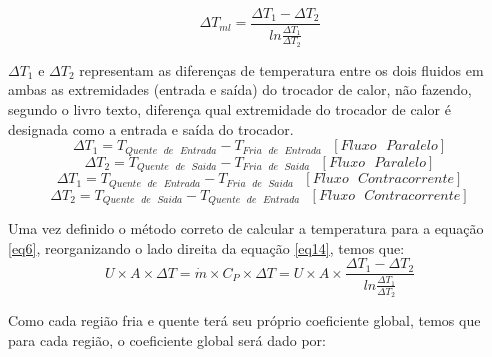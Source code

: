 \documentclass[a4paper,12pt,oneside]{article}
\begin{document}
\begin{flushright}
\begin{equation}\label{eq30}
\Delta T_{ml} = \frac{\Delta T_{1} - \Delta T_{2}}{ln \frac{\Delta T_{1}}{\Delta T_{2}}}
\end{equation}
\vspace{0.5cm}

$\Delta T_{1}$ e $\Delta T_{2}$ representam as diferenças de temperatura entre os dois fluidos em ambas as extremidades (entrada e saída) do trocador de calor, não fazendo, segundo o livro texto, diferença qual extremidade do trocador de calor é designada como a entrada e saída do trocador.\\

\begin{equation}\label{eq31}
\Delta T_{1} = T_{Quente\,\,\,\, de\,\,\,\, Entrada} - T_{Fria\,\,\,\, de\,\,\,\, Entrada} \,\,\,\,[Fluxo\,\,\,\, Paralelo]
\end{equation}
\vspace{0.1cm}
\begin{equation}\label{eq32}
\Delta T_{2} = T_{Quente\,\,\,\, de\,\,\,\, Saida} - T_{Fria\,\,\,\, de\,\,\,\, Saida} \,\,\,\, [Fluxo\,\,\,\, Paralelo]
\end{equation}
\vspace{0.1cm}
\begin{equation}\label{eq33}
\Delta T_{1} = T_{Quente\,\,\,\, de\,\,\,\, Entrada} - T_{Fria\,\,\,\, de\,\,\,\, Saida} \,\,\,\,[Fluxo\,\,\,\, Contracorrente]
\end{equation}
\vspace{0.1cm}
\begin{equation}\label{eq34}
\Delta T_{2} = T_{Quente\,\,\,\, de\,\,\,\, Saida} - T_{Quente\,\,\,\, de\,\,\,\, Entrada} \,\,\,\, [Fluxo\,\,\,\, Contracorrente]
\end{equation}
\vspace{0.1cm}


Uma vez definido o método correto de calcular a temperatura para a equação \ref{eq6}, reorganizando o lado direita da equação \ref{eq14}, temos que:\\

\begin{equation}\label{eq35}
U \times A \times \Delta T = \dot{m} \times C_{P} \times \Delta T = U \times A \times \frac{\Delta T_{1} - \Delta T_{2}}{ln \frac{\Delta T_{1}}{\Delta T_{2}}}
\end{equation}
\vspace{0.5cm}


Como cada região fria e quente terá seu próprio coeficiente global, temos que para cada região, o coeficiente global será dado por:\\


\end{flushright}
\end{document}
